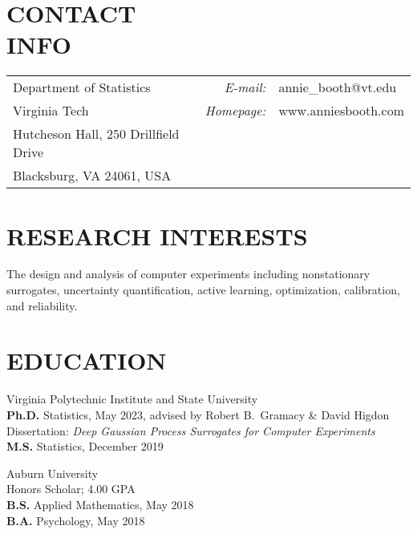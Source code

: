 \documentclass[margin,line,11pt]{res}
\begin{document}

\begin{resume}


\vspace{-0.1cm}
\section{\bf CONTACT\\INFO}
\vspace{.05in}
\begin{tabular}{@{}p{2.7in}rp{2in}}
Department of Statistics  & {\it E-mail:} & annie\_booth@vt.edu \\            
Virginia Tech & {\it Homepage:} & www.anniesbooth.com \\   
Hutcheson Hall, 250 Drillfield Drive \\     
Blacksburg, VA 24061, USA  
\end{tabular}

\medskip
\section{\bf RESEARCH INTERESTS}

The design and analysis of computer experiments including nonstationary surrogates, 
uncertainty quantification, active learning, optimization, calibration, and reliability.


\medskip
\section{\bf EDUCATION}

{\sc Virginia Polytechnic Institute and State University} \\
{\bf Ph.D.} Statistics, May 2023, advised by Robert B.~Gramacy \& David Higdon \\
Dissertation: {\it Deep Gaussian Process Surrogates for Computer Experiments} \\
{\bf M.S.} Statistics, December 2019 

{\sc Auburn University} \\
Honors Scholar; 4.00 GPA \\
{\bf B.S.} Applied Mathematics, May 2018 \\
{\bf B.A.} Psychology, May 2018


\end{resume}
\end{document}
